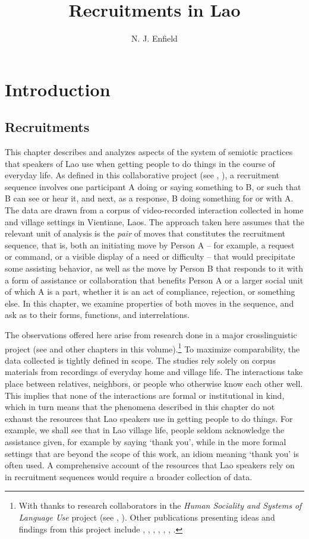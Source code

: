 \documentclass[output=paper]{langsci/langscibook}
\author{N. J. Enfield\affiliation{Department of Linguistics, The University of Sydney}}
\title{Recruitments in Lao}
\begin{document}
\section{Introduction}
\subsection{Recruitments}
This chapter describes and analyzes aspects of the system of semiotic practices that speakers of Lao use when getting people to do things in the course of everyday life. As defined in this collaborative project (see , ), a recruitment sequence involves one participant A doing or saying something to B, or such that B can see or hear it, and next, as a response, B doing something for or with A. The data are drawn from a corpus of video-recorded interaction collected in home and village settings in Vientiane, Laos. The approach taken here assumes that the relevant unit of analysis is the \textit{pair} of moves that constitutes the recruitment sequence, that is, both an initiating move by Person A -- for example, a request or command, or a visible display of a need or difficulty -- that would precipitate some assisting behavior, as well as the move by Person B that responds to it with a form of assistance or collaboration that benefits Person A or a larger social unit of which A is a part, whether it is an act of compliance, rejection, or something else. In this chapter, we examine properties of both moves in the sequence, and ask as to their forms, functions, and interrelations.

The observations offered here arise from research done in a major crosslinguistic project (see  and other chapters in this volume).\footnote{With thanks to research collaborators in the \textit{Human Sociality and Systems of Language Use} project (see , ). Other publications presenting ideas and findings from this project include \citet{Enfield2011a,Enfield2011b,enfield_human_2014}, \citet{FloydEtAl2014b,FloydEtAl2018}, \citet{Rossi2012,Rossi2014,Rossi2015a}, \citet{DrewCouper-Kuhlen2014a}, \citet{KendrickDrew2016}, \citet{ZinkenRossi2016}, \citet{Floyd2017}.} To maximize comparability, the data collected is tightly defined in scope. The studies rely solely on corpus materials from recordings of everyday home and village life. The interactions take place between relatives, neighbors, or people who otherwise know each other well. This implies that none of the interactions are formal or institutional in kind, which in turn means that the phenomena described in this chapter do not exhaust the resources that Lao speakers use in getting people to do things. For example, we shall see that in Lao village life, people seldom acknowledge the assistance given, for example by saying ‘thank you’, while in the more formal settings that are beyond the scope of this work, an idiom meaning ‘thank you’ is often used. A comprehensive account of the resources that Lao speakers rely on in recruitment sequences would require a broader collection of data.
\end{document}
